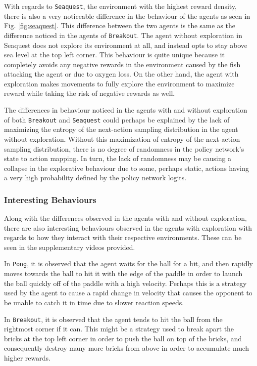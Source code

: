 \documentclass{article}
\begin{document}
With regards to \texttt{Seaquest}, the environment with the highest reward density, there is also a very noticeable difference in the behaviour of the agents as seen in Fig. \ref{fig:seaquest}. This difference between the two agents is the same as the difference noticed in the agents of \texttt{Breakout}. The agent without exploration in Seaquest does not explore its environment at all, and instead opts to stay above sea level at the top left corner. This behaviour is quite unique because it completely avoids any negative rewards in the environment caused by the fish attacking the agent or due to oxygen loss. On the other hand, the agent with exploration makes movements to fully explore the environment to maximize reward while taking the risk of negative rewards as well.

The differences in behaviour noticed in the agents with and without exploration of both \texttt{Breakout} and \texttt{Seaquest} could perhaps be explained by the lack of maximizing the entropy of the next-action sampling distribution in the agent without exploration. Without this maximization of entropy of the next-action sampling distribution, there is no degree of randomness in the policy network’s state to action mapping. In turn, the lack of randomness may be causing a collapse in the explorative behaviour due to some, perhaps static, actions having a very high probability defined by the policy network logits.

\subsubsection{Interesting Behaviours}

Along with the differences observed in the agents with and without exploration, there are also interesting behaviours observed in the agents with exploration with regards to how they interact with their respective environments. These can be seen in the supplementary videos provided.

In \texttt{Pong}, it is observed that the agent waits for the ball for a bit, and then rapidly moves towards the ball to hit it with the edge of the paddle in order to launch the ball quickly off of the paddle with a high velocity. Perhaps this is a strategy used by the agent to cause a rapid change in velocity that causes the opponent to be unable to catch it in time due to slower reaction speeds.

In \texttt{Breakout}, it is observed that the agent tends to hit the ball from the rightmost corner if it can. This might be a strategy used to break apart the bricks at the top left corner in order to push the ball on top of the bricks, and consequently destroy many more bricks from above in order to accumulate much higher rewards.
\end{document}
